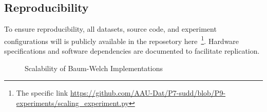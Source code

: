 \subsection{Reproducibility}
To ensure reproducibility, all datasets, source code, and experiment configurations will is publicly available in the reposetory here~\cite{p7}\footnote{The specific link \url{https://github.com/AAU-Dat/P7-sudd/blob/P9-experiments/scaling_experiment.py}}. 
Hardware specifications and software dependencies are documented to facilitate replication.

\begin{figure}
    \centering
    
    \caption{Scalability of Baum-Welch Implementations}
    \label{fig:scalability}
\end{figure}